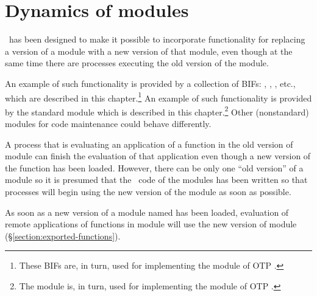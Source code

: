 %
%
%
%
%
%
%

\chapter{Dynamics of modules}

\label{chapter:module-dynamics}

\Erlang\ has been designed to make it possible to incorporate functionality for
replacing a version of a module with a new version of that module, even though
at the same time there are processes executing the old version of the module.

\ifOld
An example of such functionality is provided by a collection of BIFs:
, , , etc.,
which are described in this chapter.\footnote{These BIFs are, in turn, used for
implementing the  module of OTP \cite[p.~158--167]{otp-dev-ref}.}
\fi
\ifStd
An example of such functionality is provided by the standard module
 which is described in this chapter.\footnote{The module
 is, in turn, used for
implementing the  module of OTP \cite[p.~158--167]{otp-dev-ref}.}
Other (nonstandard) modules for code maintenance could behave differently.
\fi

A process that is evaluating
an application of a function in the old version of module can finish the evaluation
of that application even though a new version of the function has been loaded.
However, there can be only one ``old version'' of a module so
it is presumed that the \Erlang\ code of the modules has been written
so that processes will begin using the new version of the module as soon as possible.

As soon as a new version of a module named  has been loaded, evaluation of
remote applications of functions in module  will use the new version of module
(\S\ref{section:exported-functions}).

